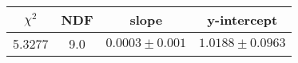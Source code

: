 \begin{tabular}{|c|c|c|c|}

\hline
$\chi^{2}$ & NDF & slope & y-intercept  \\
\hline
5.3277 & 9.0 & $0.0003\pm0.001$ & $1.0188\pm0.0963$ \\
\hline

\end{tabular}